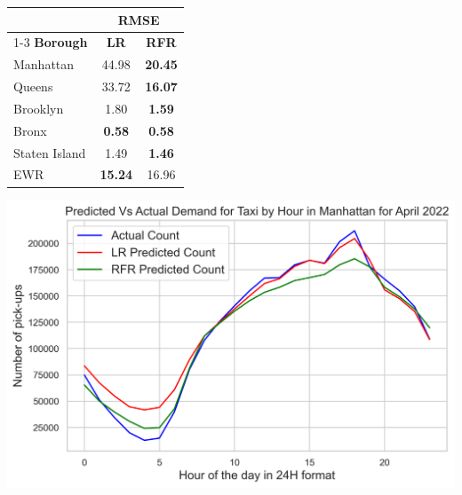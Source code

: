 \documentclass[11pt]{article}
\begin{document}
    
\vspace{0.5cm}
\begin{minipage}{\textwidth}
  \begin{minipage}[b]{0.5\textwidth}
  \centering
  \begin{tabular}{lcc}
  \toprule
    \multirow{3}{*}{} &
      \multicolumn{2}{c}{\bf RMSE} \\
      \cmidrule(lr){1-3}
      \bf Borough & \bf LR & \bf {RFR} \\
      \midrule
    Manhattan & {44.98} & {\bf 20.45} \\
    \hline
    Queens & {33.72} &  \bf 16.07 \\
    \hline
    Brooklyn & { 1.80} & \bf 1.59 \\
    \hline
    Bronx &  {\bf 0.58} & \bf 0.58\\
    \hline
    Staten Island &  {1.49} & \bf 1.46\\
    \hline
    EWR &  {\bf15.24} & 16.96\\
    \bottomrule
    
  \end{tabular}
      \label{Table2}
      \vspace{-0.3cm}
    \end{minipage}
  \hspace{-0.8cm}
  \begin{minipage}[t]{0.5\textwidth}
  \captionsetup{justification=centering}
    \includegraphics[width=1\linewidth]{plots/predicted_trend.png}
    
    \vspace{-0.3cm}
    \label{fig4}
  \end{minipage}
  
  \end{minipage}
\vspace{0.3cm}
\end{document}
